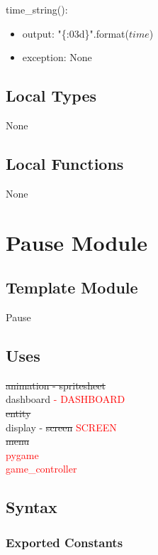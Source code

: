 \documentclass[12pt]{article}
\begin{document}
\noindent time\_string():
\begin{itemize}
    \item output: "\{:03d\}".format($time$)
    
    \item exception: None
\end{itemize}

\subsection* {Local Types}

None

\subsection* {Local Functions}

None

\newpage

\section* {Pause Module}

\subsection*{Template Module}

Pause

\subsection *{Uses}

\sout{animation - spritesheet} \\
dashboard \textcolor{red}{- DASHBOARD}\\
\sout{entity} \\
display - \sout{screen} \textcolor{red}{SCREEN} \\
\sout{menu} \\
\textcolor{red}{pygame} \\
\textcolor{red}{game\_controller}

\subsection* {Syntax}

\subsubsection* {Exported Constants}
\end{document}
